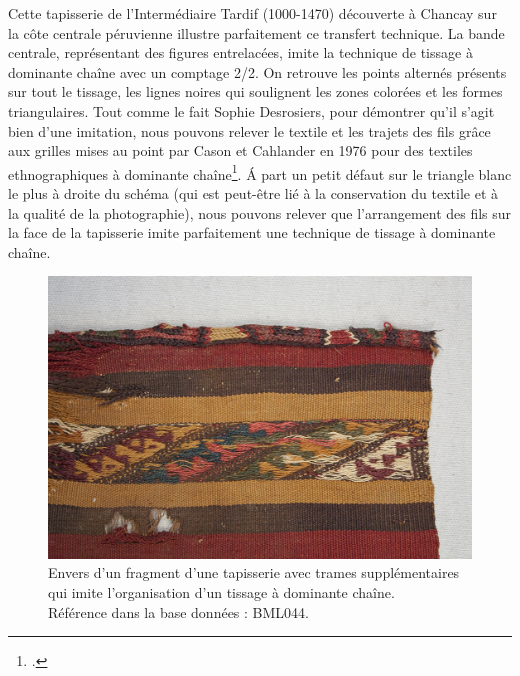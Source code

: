 Cette tapisserie de l'Intermédiaire Tardif (1000-1470) découverte à Chancay sur la côte centrale péruvienne illustre parfaitement ce transfert technique. La bande centrale, représentant des figures entrelacées, imite la technique de tissage à dominante chaîne avec un comptage 2/2. On retrouve les points alternés présents sur tout le tissage, les lignes noires qui soulignent les zones colorées et les formes triangulaires. Tout comme le fait Sophie Desrosiers, pour démontrer qu'il s'agit bien d'une imitation, nous pouvons relever le textile et les trajets des fils grâce aux grilles mises au point par Cason et Cahlander en 1976 pour des textiles ethnographiques à dominante chaîne\footcite[p.~49-51]{casonArtBolivianHighland1976}. Á part un petit défaut sur le triangle blanc le plus à droite du schéma (qui est peut-être lié à la conservation du textile et à la qualité de la photographie), nous pouvons relever que l'arrangement des fils sur la face de la tapisserie imite parfaitement une technique de tissage à dominante chaîne.

\begin{figure}[!ht]
       \begin{center}
        		\includegraphics[width=14cm]{../images/BML044_arriere.jpg}
	\end{center}
    \caption{Envers d'un fragment d'une tapisserie avec trames supplémentaires qui imite l'organisation d'un tissage à dominante chaîne. \\ Référence dans la base données : BML044.}
    \label{fig:BML044_arriere}
\end{figure}

